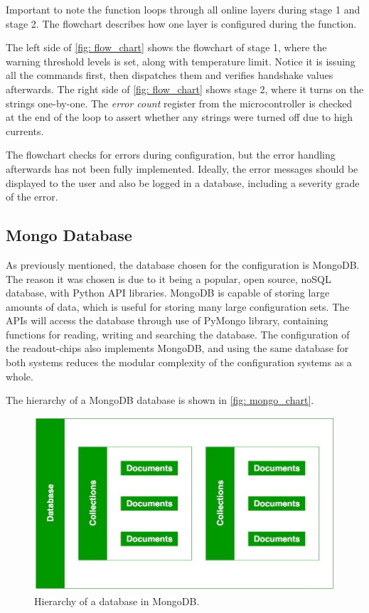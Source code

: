 \documentclass[main.tex]{subfiles}
\begin{document}
Important to note the function loops through all online layers during stage 1 and stage 2. The flowchart describes how one layer is configured during the function.

The left side of \autoref{fig: flow_chart} shows the flowchart of stage 1, where the warning threshold levels is set, along with temperature limit. Notice it is issuing all the commands first, then dispatches them and verifies handshake values afterwards.  The right side of \autoref{fig: flow_chart} shows stage 2, where it turns on the strings one-by-one. The \textit{error count} register from the microcontroller is checked at the end of the loop to assert whether any strings were turned off due to high currents. 

The flowchart checks for errors during configuration, but the error handling afterwards has not been fully implemented. Ideally, the error messages should be displayed to the user and also be logged in a database, including a severity grade of the error.


\subsection{Mongo Database}
\label{ssec: mongo}
As previously mentioned, the database chosen for the configuration is MongoDB. The reason it was chosen is due to it being a popular, open source, noSQL database, with Python API libraries. MongoDB is capable of storing large amounts of data, which is useful for storing many large configuration sets. The APIs will access the database through use of PyMongo library, containing functions for reading, writing and searching the database. The configuration of the readout-chips also implements MongoDB, and using the same database for both systems reduces the modular complexity of the configuration systems as a whole.

The hierarchy of a MongoDB database is shown in \autoref{fig: mongo_chart}.

\begin{figure}[!ht]
    \centering
    \includegraphics[width=12cm, scale=1.5]{images/mongodb-nosql-working.jpg}
    \caption{Hierarchy of a database in MongoDB.}
    \label{fig: mongo_chart}
\end{figure}
\FloatBarrier
\end{document}
